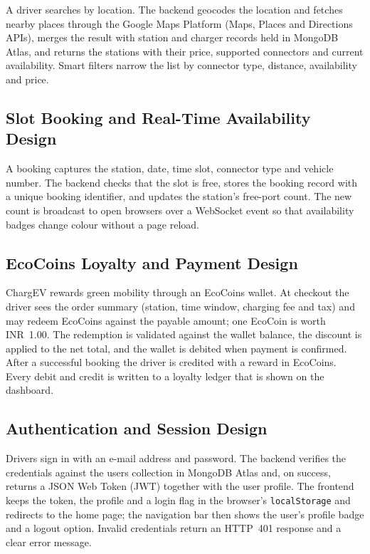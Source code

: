 \documentclass{tietreport}
\begin{document}
A driver searches by location. The backend geocodes the
location and fetches nearby places through the Google
Maps Platform (Maps, Places and Directions APIs), merges
the result with station and charger records held in
MongoDB Atlas, and returns the stations with their price,
supported connectors and current availability. Smart
filters narrow the list by connector type, distance,
availability and price.

\subsection{Slot Booking and Real-Time Availability Design}

A booking captures the station, date, time slot,
connector type and vehicle number. The backend checks that
the slot is free, stores the booking record with a unique
booking identifier, and updates the station's free-port
count. The new count is broadcast to open browsers over a
WebSocket event so that availability badges change colour
without a page reload.

\subsection{EcoCoins Loyalty and Payment Design}

ChargEV rewards green mobility through an EcoCoins wallet.
At checkout the driver sees the order summary (station,
time window, charging fee and tax) and may redeem EcoCoins
against the payable amount; one EcoCoin is worth
INR~1.00. The redemption is validated against the wallet
balance, the discount is applied to the net total, and the
wallet is debited when payment is confirmed. After a
successful booking the driver is credited with a reward in
EcoCoins. Every debit and credit is written to a loyalty
ledger that is shown on the dashboard.

\subsection{Authentication and Session Design}

Drivers sign in with an e-mail address and password. The
backend verifies the credentials against the users
collection in MongoDB Atlas and, on success, returns a
JSON Web Token (JWT) together with the user profile. The
frontend keeps the token, the profile and a login flag in
the browser's \texttt{localStorage} and redirects to the
home page; the navigation bar then shows the user's
profile badge and a logout option. Invalid credentials
return an HTTP~401 response and a clear error message.
\end{document}
